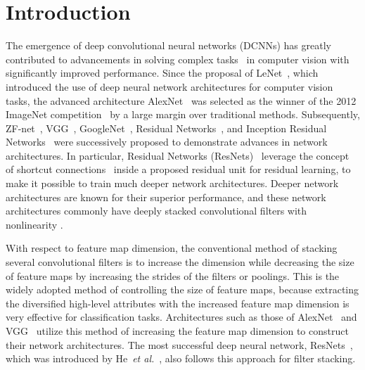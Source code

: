 \documentclass[10pt,twocolumn,letterpaper]{article}
\begin{document}


\section{Introduction}
The emergence of deep convolutional neural networks (DCNNs) has greatly contributed to advancements in solving complex tasks~\cite{alexnet, overfeat, decaf, rcnn, FCN} in computer vision with significantly improved performance. Since the proposal of LeNet~\cite{Lenet}, which introduced the use of deep neural network architectures for computer vision tasks, the advanced architecture AlexNet~\cite{alexnet} was selected as the winner of the 2012 ImageNet competition~\cite{ImageNet} by a large margin over traditional methods. Subsequently, ZF-net~\cite{zfnet}, VGG~\cite{VGG}, GoogleNet~\cite{GoogleNet}, Residual Networks~\cite{resnet, preresnet}, and Inception Residual Networks~\cite{InceptionResnet} were successively proposed to demonstrate advances in network architectures. In particular, Residual Networks (ResNets)~\cite{resnet, preresnet} leverage the concept of shortcut connections~\cite{Highway} inside a proposed residual unit for residual learning, to make it possible to train much deeper network architectures. Deeper network architectures are known for their superior performance, and these network architectures commonly have deeply stacked convolutional filters with nonlinearity \cite{VGG,GoogleNet}.

With respect to feature map dimension, the conventional method of stacking several convolutional filters is to increase the dimension while decreasing the size of feature maps by increasing the strides of the filters or poolings. This is the widely adopted method of controlling the size of feature maps, because extracting the diversified high-level attributes with the increased feature map dimension is very effective for classification tasks. Architectures such as those of AlexNet~\cite{alexnet} and VGG~\cite{VGG} utilize this method of increasing the feature map dimension to construct their network architectures. The most successful deep neural network, ResNets~\cite{resnet,preresnet}, which was introduced by He~\textit{et al.}~\cite{resnet}, also follows this approach for filter stacking.
\end{document}
